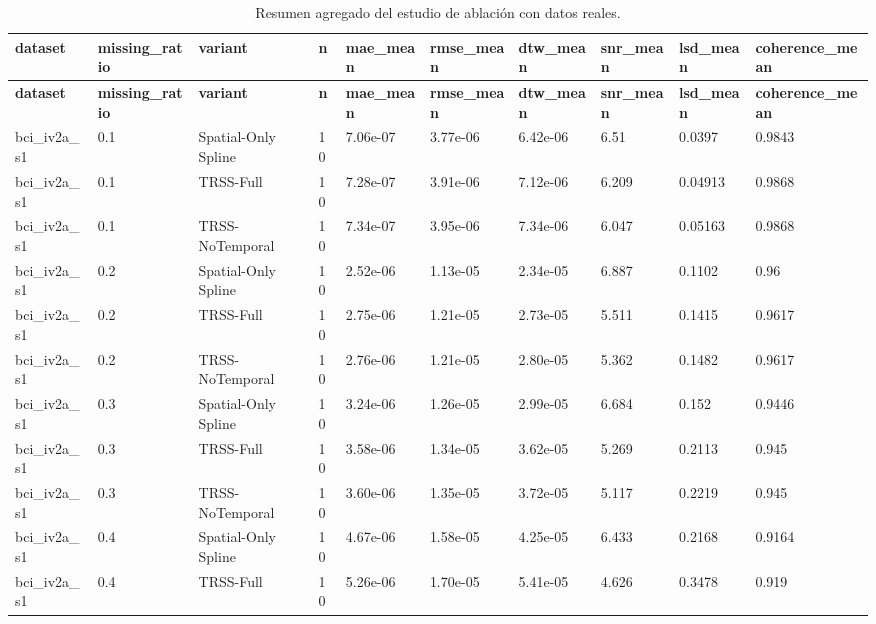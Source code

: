\begin{landscape}
\scriptsize
\begin{longtable}{p{}p{}p{}p{}p{}p{}p{}p{}p{}p{}}
\caption{Resumen agregado del estudio de ablación con datos reales.}\label{tab:app_ablation_real_summary}\\
\toprule
\textbf{dataset} & \textbf{missing\_ratio} & \textbf{variant} & \textbf{n} & \textbf{mae\_mean} & \textbf{rmse\_mean} & \textbf{dtw\_mean} & \textbf{snr\_mean} & \textbf{lsd\_mean} & \textbf{coherence\_mean} \\
\midrule
\endfirsthead
\toprule
\textbf{dataset} & \textbf{missing\_ratio} & \textbf{variant} & \textbf{n} & \textbf{mae\_mean} & \textbf{rmse\_mean} & \textbf{dtw\_mean} & \textbf{snr\_mean} & \textbf{lsd\_mean} & \textbf{coherence\_mean} \\
\midrule
\endhead
bci\_iv2a\_s1 & 0.1 & Spatial-Only Spline & 10 & 7.06e-07 & 3.77e-06 & 6.42e-06 & 6.51 & 0.0397 & 0.9843 \\
bci\_iv2a\_s1 & 0.1 & TRSS-Full & 10 & 7.28e-07 & 3.91e-06 & 7.12e-06 & 6.209 & 0.04913 & 0.9868 \\
bci\_iv2a\_s1 & 0.1 & TRSS-NoTemporal & 10 & 7.34e-07 & 3.95e-06 & 7.34e-06 & 6.047 & 0.05163 & 0.9868 \\
bci\_iv2a\_s1 & 0.2 & Spatial-Only Spline & 10 & 2.52e-06 & 1.13e-05 & 2.34e-05 & 6.887 & 0.1102 & 0.96 \\
bci\_iv2a\_s1 & 0.2 & TRSS-Full & 10 & 2.75e-06 & 1.21e-05 & 2.73e-05 & 5.511 & 0.1415 & 0.9617 \\
bci\_iv2a\_s1 & 0.2 & TRSS-NoTemporal & 10 & 2.76e-06 & 1.21e-05 & 2.80e-05 & 5.362 & 0.1482 & 0.9617 \\
bci\_iv2a\_s1 & 0.3 & Spatial-Only Spline & 10 & 3.24e-06 & 1.26e-05 & 2.99e-05 & 6.684 & 0.152 & 0.9446 \\
bci\_iv2a\_s1 & 0.3 & TRSS-Full & 10 & 3.58e-06 & 1.34e-05 & 3.62e-05 & 5.269 & 0.2113 & 0.945 \\
bci\_iv2a\_s1 & 0.3 & TRSS-NoTemporal & 10 & 3.60e-06 & 1.35e-05 & 3.72e-05 & 5.117 & 0.2219 & 0.945 \\
bci\_iv2a\_s1 & 0.4 & Spatial-Only Spline & 10 & 4.67e-06 & 1.58e-05 & 4.25e-05 & 6.433 & 0.2168 & 0.9164 \\
bci\_iv2a\_s1 & 0.4 & TRSS-Full & 10 & 5.26e-06 & 1.70e-05 & 5.41e-05 & 4.626 & 0.3478 & 0.919 \\

\end{longtable}
\end{landscape}
